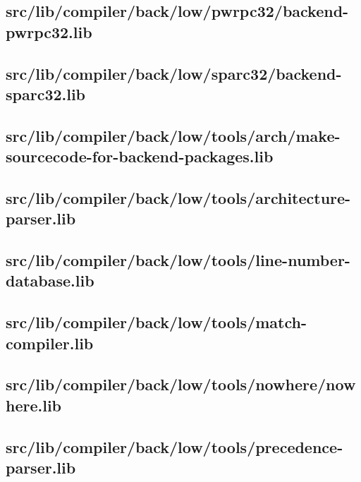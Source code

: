 \subsection{src/lib/compiler/back/low/pwrpc32/backend-pwrpc32.lib}


\subsection{src/lib/compiler/back/low/sparc32/backend-sparc32.lib}


\subsection{src/lib/compiler/back/low/tools/arch/make-sourcecode-for-backend-packages.lib}


\subsection{src/lib/compiler/back/low/tools/architecture-parser.lib}


\subsection{src/lib/compiler/back/low/tools/line-number-database.lib}


\subsection{src/lib/compiler/back/low/tools/match-compiler.lib}


\subsection{src/lib/compiler/back/low/tools/nowhere/nowhere.lib}


\subsection{src/lib/compiler/back/low/tools/precedence-parser.lib}


